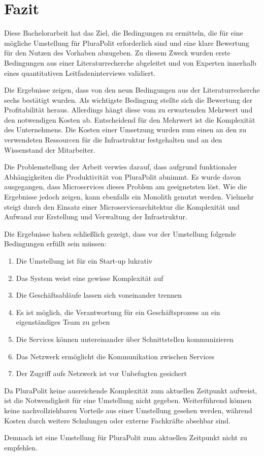 \section{Fazit}

Diese Bachelorarbeit hat das Ziel, die Bedingungen zu ermitteln, die für eine mögliche Umstellung für PluraPolit erforderlich sind und eine klare Bewertung für den Nutzen des Vorhaben abzugeben. Zu diesem Zweck wurden erste Bedingungen aus einer Literaturrecherche abgeleitet und von Experten innerhalb eines quantitativen Leitfadeninterviews validiert.

Die Ergebnisse zeigen, dass von den neun Bedingungen aus der Literaturrecherche sechs bestätigt wurden.
Als wichtigste Bedingung stellte sich die Bewertung der Profitabilität heraus. Allerdings hängt diese vom zu erwartenden Mehrwert und den notwendigen Kosten ab. Entscheidend für den Mehrwert ist die Komplexität des Unternehmens. Die Kosten einer Umsetzung wurden zum einen an den zu verwendeten Ressourcen für die Infrastruktur festgehalten und an den Wissenstand der Mitarbeiter.

Die Problemstellung der Arbeit verwies darauf, dass aufgrund funktionaler Abhängigkeiten die Produktivität von PluraPolit abnimmt. Es wurde davon ausgegangen, dass Microservices dieses Problem am geeignetsten löst.
Wie die Ergebnisse jedoch zeigen, kann ebenfalls ein Monolith genutzt werden. Vielmehr steigt durch den Einsatz einer Microservicearchitektur die Komplexität und Aufwand zur Erstellung und Verwaltung der Infrastruktur.

Die Ergebnisse haben schließlich gezeigt, dass vor der Umstellung folgende Bedingungen erfüllt sein müssen:
\begin{enumerate}
	\item Die Umstellung ist für ein Start-up lukrativ
	\item Das System weist eine gewisse Komplexität auf
	\item Die Geschäftsabläufe lassen sich voneinander trennen
	\item Es ist möglich, die Verantwortung für ein Geschäftsprozess an ein eigenständiges Team zu geben
	\item Die Services können untereinander über Schnittstellen kommunizieren
	\item Das Netzwerk ermöglicht die Kommunikation zwischen Services
	\item Der Zugriff aufs Netzwerk ist vor Unbefugten gesichert
\end{enumerate}

Da PluraPolit keine ausreichende Komplexität zum aktuellen Zeitpunkt aufweist, ist die Notwendigkeit für eine Umstellung nicht gegeben. Weiterführend können keine nachvollziehbaren Vorteile aus einer Umstellung gesehen werden, während Kosten durch weitere Schulungen oder externe Fachkräfte absehbar sind.

Demnach ist eine Umstellung für PluraPolit zum aktuellen Zeitpunkt nicht zu empfehlen.

